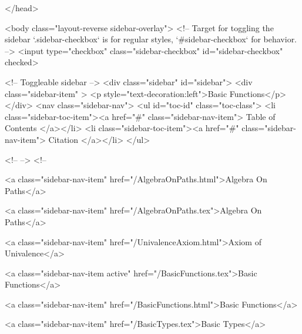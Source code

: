   
</head>




  <body class="layout-reverse sidebar-overlay">
    <!-- Target for toggling the sidebar `.sidebar-checkbox` is for regular
     styles, `#sidebar-checkbox` for behavior. -->
<input type="checkbox" class="sidebar-checkbox" id="sidebar-checkbox" checked>

<!-- Toggleable sidebar -->
<div class="sidebar" id="sidebar">
  <div class="sidebar-item" >
    <p style="text-decoration:left">Basic Functions</p>
  </div>
  <nav class="sidebar-nav">
    <ul id="toc-id" class="toc-class">
  <li class="sidebar-toc-item"><a href="#" class="sidebar-nav-item"> Table of Contents </a></li>
  <li class="sidebar-toc-item"><a href="#" class="sidebar-nav-item"> Citation </a></li>
</ul>


    <!--  -->
    <!-- 
      
    
      
    
      
    
      
        
      
    
      
        
          <a class="sidebar-nav-item" href="/AlgebraOnPaths.html">Algebra On Paths</a>
        
      
    
      
        
          <a class="sidebar-nav-item" href="/AlgebraOnPaths.tex">Algebra On Paths</a>
        
      
    
      
        
          <a class="sidebar-nav-item" href="/UnivalenceAxiom.html">Axiom of Univalence</a>
        
      
    
      
        
          <a class="sidebar-nav-item active" href="/BasicFunctions.tex">Basic Functions</a>
        
      
    
      
        
          <a class="sidebar-nav-item" href="/BasicFunctions.html">Basic Functions</a>
        
      
    
      
        
          <a class="sidebar-nav-item" href="/BasicTypes.tex">Basic Types</a>
        
      
    
      
        

